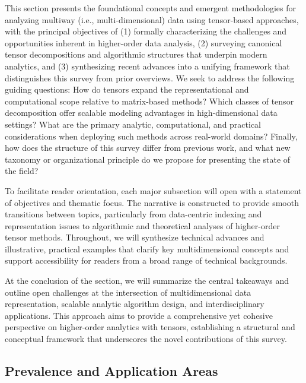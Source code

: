 \documentclass[sigconf]{acmart}
\begin{document}
This section presents the foundational concepts and emergent methodologies for analyzing multiway (i.e., multi-dimensional) data using tensor-based approaches, with the principal objectives of (1) formally characterizing the challenges and opportunities inherent in higher-order data analysis, (2) surveying canonical tensor decompositions and algorithmic structures that underpin modern analytics, and (3) synthesizing recent advances into a unifying framework that distinguishes this survey from prior overviews. We seek to address the following guiding questions: How do tensors expand the representational and computational scope relative to matrix-based methods? Which classes of tensor decomposition offer scalable modeling advantages in high-dimensional data settings? What are the primary analytic, computational, and practical considerations when deploying such methods across real-world domains? Finally, how does the structure of this survey differ from previous work, and what new taxonomy or organizational principle do we propose for presenting the state of the field?

To facilitate reader orientation, each major subsection will open with a statement of objectives and thematic focus. The narrative is constructed to provide smooth transitions between topics, particularly from data-centric indexing and representation issues to algorithmic and theoretical analyses of higher-order tensor methods. Throughout, we will synthesize technical advances and illustrative, practical examples that clarify key multidimensional concepts and support accessibility for readers from a broad range of technical backgrounds.

At the conclusion of the section, we will summarize the central takeaways and outline open challenges at the intersection of multidimensional data representation, scalable analytic algorithm design, and interdisciplinary applications. This approach aims to provide a comprehensive yet cohesive perspective on higher-order analytics with tensors, establishing a structural and conceptual framework that underscores the novel contributions of this survey.

\subsection{Prevalence and Application Areas}
\end{document}
